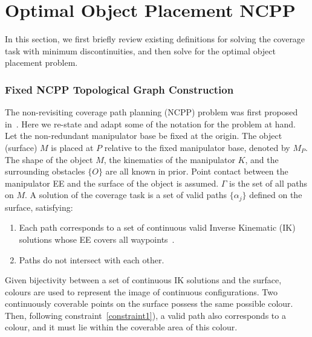 \documentclass[letterpaper, 10pt, conference]{ieeeconf}
\begin{document}
\section{Optimal Object Placement NCPP}
\label{sectionproblemformulation}
In this section, we first briefly review existing definitions for solving the coverage task with minimum discontinuities, and then solve for the optimal object placement problem. 
\subsubsection{Fixed NCPP Topological Graph Construction}
\label{subsection_NCPP}
The non-revisiting coverage path planning (NCPP) problem was first proposed in~\cite{Yang2020Nonrevisiting}. Here we re-state and adapt some of the notation for the problem at hand. 
Let the non-redundant manipulator base be fixed at the origin. The object (surface) $M$ is placed at $P$ relative to the fixed manipulator base, denoted by $M_P$. The shape of the object $M$, the kinematics of the manipulator $K$, and the surrounding obstacles $\{O\}$ are all known in prior. Point contact between the manipulator EE and the surface of the object is assumed. $\Gamma$ is the set of all paths on $M$. A solution of the coverage task is a set of valid paths $\{\alpha_j\}$ defined on the surface, satisfying: 
\begin{enumerate}
\item Each path corresponds to a set of continuous valid Inverse Kinematic (IK) solutions whose EE covers all waypoints~\cite{Yang2020Nonrevisiting}.  
\label{constraint1} 
\item Paths do not intersect with each other.
\end{enumerate}
Given bijectivity between a set of continuous IK solutions and the surface, colours are used to represent the image of continuous configurations.
Two continuously coverable points on the surface possess the same possible colour. 
Then, following constraint~\ref{constraint1}), a valid path also corresponds to a colour, and it must lie within the coverable area of this colour. 
\end{document}
